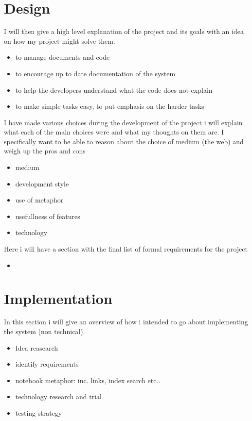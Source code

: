 \documentclass[a4paper, 11pt]{article}
\begin{document}
\section{Design}

I will then give a high level explanation of the project and its goals with an
idea on how my project might solve them.

\begin{itemize}
  \item{to manage documents and code}
  \item{to encourage up to date documentation of the system}
  \item{to help the developers understand what the code does not explain}
  \item{to make simple tasks easy, to put emphasis on the harder tasks}
\end{itemize}

I have made various choices during the development of the project i will explain
what each of the main choices were and what my thoughts on them are. I
specifically want to be able to reason about the choice of medium (the web) and
weigh up the pros and cons

\begin{itemize}
  \item{medium}
  \item{development style}
  \item{use of metaphor}
  \item{usefullness of features}
  \item{technology}
\end{itemize}

Here i will have a section with the final list of formal requirements for the
project

\begin{itemize}
  \item{}
\end{itemize}

\section{Implementation}

In this section i will give an overview of how i intended to go about
implementing the system (non technical).

\begin{itemize}
  \item{Idea reasearch}
  \item{identify requirements}
  \item{notebook metaphor: inc. links, index search etc..}
  \item{technology research and trial}
  \item{testing strategy}
\end{itemize}
\end{document}
